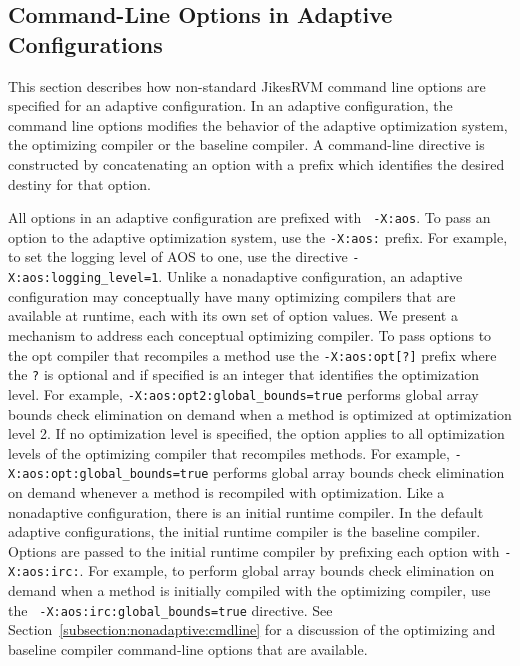\subsection{Command-Line Options in Adaptive Configurations}
\label{subsection:adaptive:cmdline}

This section describes how non-standard Jikes\trademark RVM command
line options are specified for an adaptive configuration.  In an
adaptive configuration, the command line options modifies the behavior
of the adaptive optimization system, the optimizing compiler or the
baseline compiler.  A command-line directive is constructed by
concatenating an option with a prefix which identifies the desired
destiny for that option.

All options in an adaptive configuration are prefixed with {\tt
-X:aos}.  To pass an option to the adaptive optimization system, use
the {\tt -X:aos:} prefix.  For example, to set the logging level of
AOS to one, use the directive {\tt -X:aos:logging\_level=1}.  Unlike a
nonadaptive configuration, an adaptive configuration may conceptually
have many optimizing compilers that are available at runtime, each
with its own set of option values.  We present a mechanism to address
each conceptual optimizing compiler.  To pass options to the opt
compiler that recompiles a method use the {\tt -X:aos:opt[?]} prefix
where the {\tt ?} is optional and if specified is an integer that
identifies the optimization level.  For example, 
{\tt -X:aos:opt2:global\_bounds=true} performs global array bounds check
elimination on demand when a method is optimized at optimization level
2.  If no optimization level is specified, the option applies to all
optimization levels of the optimizing compiler that recompiles
methods.  For example, {\tt -X:aos:opt:global\_bounds=true} performs
global array bounds check elimination on demand whenever a method is
recompiled with optimization.  Like a nonadaptive configuration, there
is an initial runtime compiler.  In the default adaptive
configurations, the initial runtime compiler is the baseline compiler.
Options are passed to the initial runtime compiler by prefixing each
option with {\tt -X:aos:irc:}.  For example, to perform global array
bounds check elimination on demand when a method is initially compiled
with the optimizing compiler, use the {\tt
-X:aos:irc:global\_bounds=true} directive.  See
Section~\ref{subsection:nonadaptive:cmdline} for a discussion of the
optimizing and baseline compiler command-line options that are
available.

